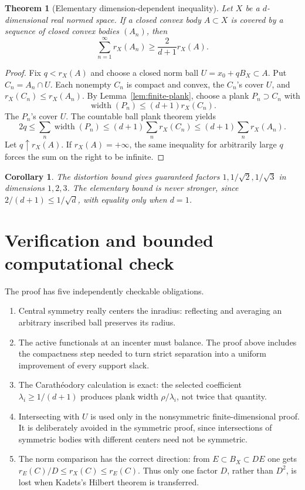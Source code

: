 \documentclass[11pt]{article}
\newtheorem{theorem}{Theorem}
\newtheorem{corollary}{Corollary}
\theoremstyle{remark}
\newcommand{\Ball}{B_X}
\newcommand{\rin}{r_X}
\begin{document}
\begin{theorem}[Elementary dimension-dependent inequality]
\label{thm:dimension}
Let \(X\) be a \(d\)-dimensional real normed space. If a closed convex body
\(A\subset X\) is covered by a sequence of closed convex bodies \((A_n)\), then
\[
  \sum_{n=1}^{\infty}\rin(A_n)
  \ge \frac{2}{d+1}\rin(A).
\]
\end{theorem}

\begin{proof}
Fix \(q<\rin(A)\) and choose a closed norm ball
\(U=x_0+q\Ball\subset A\). Put \(C_n=A_n\cap U\). Each nonempty \(C_n\) is
compact and convex, the \(C_n\)'s cover \(U\), and
\(\rin(C_n)\le\rin(A_n)\). By Lemma~\ref{lem:finite-plank}, choose a plank
\(P_n\supset C_n\) with
\[
  \operatorname{width}(P_n)\le(d+1)\rin(C_n).
\]
The \(P_n\)'s cover \(U\). The countable ball plank theorem yields
\[
  2q\le\sum_n\operatorname{width}(P_n)
      \le(d+1)\sum_n\rin(C_n)
      \le(d+1)\sum_n\rin(A_n).
\]
Let \(q\uparrow\rin(A)\). If \(\rin(A)=+\infty\), the same inequality for
arbitrarily large \(q\) forces the sum on the right to be infinite.
\end{proof}

\begin{corollary}
The distortion bound gives guaranteed factors \(1,1/\sqrt2,1/\sqrt3\) in
dimensions \(1,2,3\). The elementary bound is never stronger, since
\(2/(d+1)\le1/\sqrt d\), with equality only when \(d=1\).
\end{corollary}

\section{Verification and bounded computational check}

The proof has five independently checkable obligations.
\begin{enumerate}[leftmargin=*]
\item Central symmetry really centers the inradius: reflecting and averaging
an arbitrary inscribed ball preserves its radius.
\item The active functionals at an incenter must balance. The proof above
includes the compactness step needed to turn strict separation into a uniform
improvement of every support slack.
\item The Carath\'eodory calculation is exact: the selected coefficient
\(\lambda_i\ge1/(d+1)\) produces plank width \(\rho/\lambda_i\), not twice
that quantity.
\item Intersecting with \(U\) is used only in the nonsymmetric
finite-dimensional proof. It is deliberately avoided in the symmetric proof,
since intersections of symmetric bodies with different centers need not be
symmetric.
\item The norm comparison has the correct direction: from
\(E\subset B_X\subset DE\) one gets
\(r_E(C)/D\le r_X(C)\le r_E(C)\). Thus only one factor \(D\), rather than
\(D^2\), is lost when Kadets's Hilbert theorem is transferred.
\end{enumerate}
\end{document}
